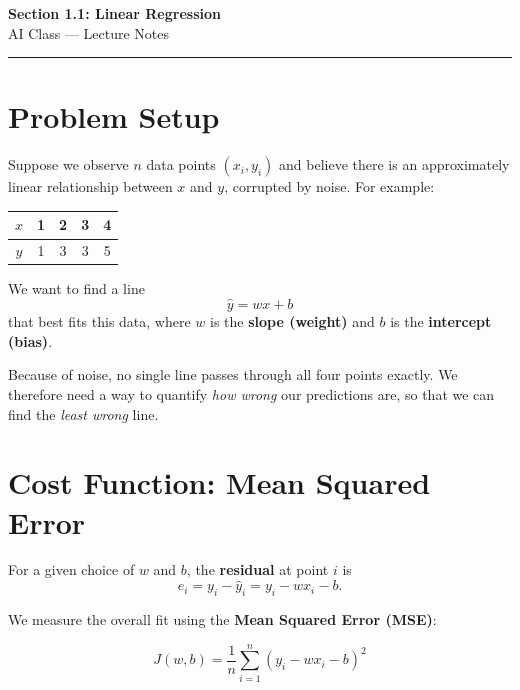 \documentclass[12pt, a4paper]{article}
\newif\ifstudentmode
\newcommand{\sol}[2][6cm]{%
  \ifstudentmode
    \underline{\hspace{#1}}%
  \else
    {#2}%
  \fi
}
\theoremstyle{definition}
\newcommand{\yhat}{\hat{y}}
\begin{document}
\begin{center}
  {\LARGE \textbf{Section 1.1: Linear Regression}} \\[0.5em]
  {\large AI Class — Lecture Notes}%
  \ifstudentmode
    \quad {\normalsize\color{gray}[Student Copy]}%
  \fi
\end{center}

\vspace{1em}
\hrule
\vspace{1.5em}

\section{Problem Setup}

Suppose we observe $n$ data points $(x_i, y_i)$ and believe there is an
approximately linear relationship between $x$ and $y$, corrupted by noise.
For example:

\begin{center}
\begin{tabular}{ccccc}
\toprule
$x$ & 1 & 2 & 3 & 4 \\
\midrule
$y$ & 1 & 3 & 3 & 5 \\
\bottomrule
\end{tabular}
\end{center}

We want to find a line
\[
  \yhat = wx + b
\]
that best fits this data, where $w$ is the \textbf{slope (weight)} and $b$
is the \textbf{intercept (bias)}.

Because of noise, no single line passes through all four points exactly.
We therefore need a way to quantify \emph{how wrong} our predictions are, so
that we can find the \emph{least wrong} line.

\section{Cost Function: Mean Squared Error}

For a given choice of $w$ and $b$, the \textbf{residual} at point $i$ is
\[
  e_i = y_i - \yhat_i = y_i - wx_i - b.
\]

We measure the overall fit using the \textbf{Mean Squared Error (MSE)}:

\begin{equation}
  J(w, b) = \sol[9cm]{\frac{1}{n}\sum_{i=1}^{n}(y_i - wx_i - b)^2}
  \label{eq:mse}
\end{equation}
\end{document}
